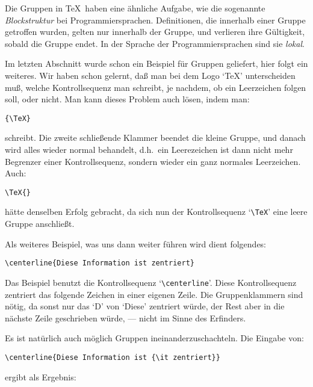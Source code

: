 Die Gruppen in \TeX\ haben eine \"ahnliche Aufgabe, wie die sogenannte
{\em Blockstruktur} bei Pro\-gram\-mier\-spra\-chen. 
Definitionen, die
innerhalb einer Gruppe getroffen wurden, gelten nur innerhalb der
Gruppe, und verlieren ihre G\"ultigkeit, sobald die Gruppe endet. In der
Sprache der Pro\-gram\-mier\-spra\-chen sind sie {\em lokal}.

Im letzten Abschnitt wurde schon ein Beispiel f\"ur Gruppen geliefert,
hier folgt ein weiteres. Wir haben schon gelernt, da\ss{} man bei dem
Logo
`\TeX' unterscheiden mu\ss{}, welche 
Kontrollsequenz man schreibt, je
nachdem, ob ein 
Leerzeichen folgen soll, oder nicht. Man kann dieses
Problem auch l\"osen, indem man:
\begin{verbatim}
{\TeX}
\end{verbatim}
schreibt. Die zweite schlie\ss{}ende Klammer beendet die kleine Gruppe,
und danach wird alles wieder normal behandelt, d.h.\ ein
Leerezeichen
ist dann nicht mehr 
Begrenzer einer Kontrollsequenz, sondern wieder
ein ganz normales Leerzeichen. Auch:
\begin{verbatim}
\TeX{}
\end{verbatim}
h\"atte denselben Erfolg gebracht, da sich nun der
Kontrollsequenz
`\verb|\TeX|' eine leere Gruppe anschlie\ss{}t.

Als weiteres Beispiel, was uns dann weiter f\"uhren wird dient
folgendes:
\begin{verbatim}
\centerline{Diese Information ist zentriert}
\end{verbatim}
Das Beispiel benutzt die 
Kontrollsequenz `\verb|\centerline|'. Diese
Kontrollsequenz 
zentriert das fol\-gen\-de Zeichen in einer eigenen Zeile.
Die 
Gruppenklammern sind n\"otig, da sonst nur das `D' von `Diese'
zentriert w\"urde, der Rest aber in die n\"achste Zeile geschrieben w\"urde,
--- nicht im Sinne des Erfinders.

Es ist nat\"urlich auch m\"oglich 
Gruppen ineinanderzuschachteln. Die Eingabe von:
\begin{verbatim}
\centerline{Diese Information ist {\it zentriert}}
\end{verbatim}
ergibt als Ergebnis:\medskip

